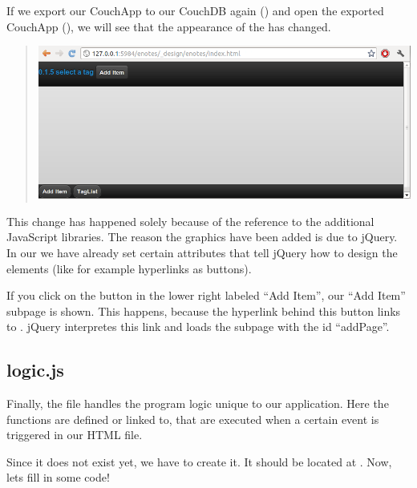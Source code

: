 \documentclass[letterpaper,10pt,english]{sphinxmanual}
\begin{document}
If we export our CouchApp to our CouchDB again () and open the exported CouchApp (), we will see that the appearance of the  has changed.
\begin{quote}

\includegraphics{4_jQuery.png}
\end{quote}

This change has happened solely because of the reference to the additional JavaScript libraries. The reason the graphics have been added is due to jQuery. In our  we have already set certain attributes that tell jQuery how to design the elements (like for example hyperlinks as buttons).

If you click on the button in the lower right labeled ``Add Item'', our ``Add Item'' subpage is shown. This happens, because the hyperlink behind this button links to . jQuery interpretes this link and loads the subpage with the id ``addPage''.


\subsection{logic.js}
\label{4-Logic:logic-js}
Finally, the file  handles the program logic unique to our application. Here the functions are defined or linked to, that are executed when a certain event is triggered in our HTML file.

Since it does not exist yet, we have to create it. It should be located at . Now, lets fill in some code!
\end{document}
